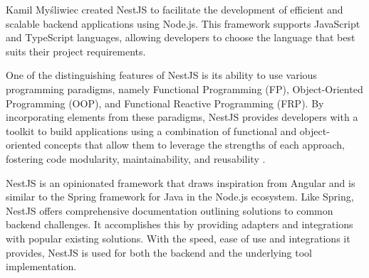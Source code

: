Kamil Myśliwiec created NestJS to facilitate the development of efficient and
scalable backend applications using Node.js. This framework supports JavaScript
and TypeScript languages, allowing developers to choose the language that best
suits their project requirements.

One of the distinguishing features of NestJS is its ability to use various
programming paradigms, namely Functional Programming (FP), Object-Oriented
Programming (OOP), and Functional Reactive Programming (FRP). By incorporating
elements from these paradigms, NestJS provides developers with a toolkit to
build applications using a combination of functional and object-oriented
concepts that allow them to leverage the strengths of each approach, fostering
code modularity, maintainability, and reusability \cite{nestjs}.

NestJS is an opinionated framework that draws inspiration from Angular and is
similar to the Spring framework for Java in the Node.js ecosystem. Like Spring,
NestJS offers comprehensive documentation outlining solutions to common backend
challenges. It accomplishes this by providing adapters and integrations with
popular existing solutions. With the speed, ease of use and integrations it
provides, NestJS is used for both the backend and the underlying tool
implementation.
